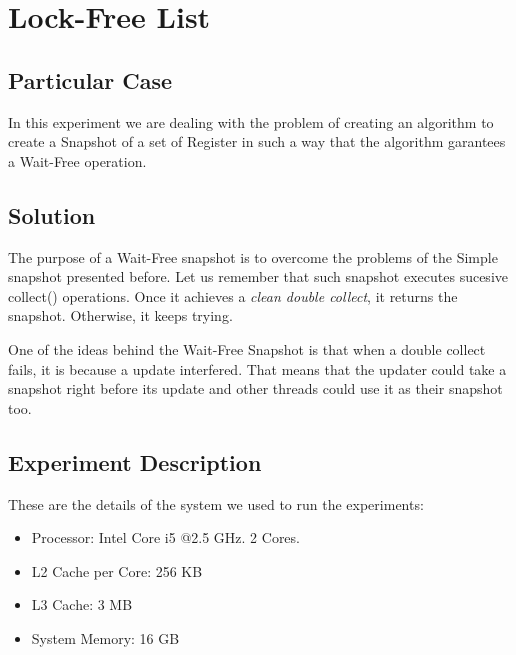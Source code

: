 \section{\textbf{Lock-Free List}}
\subsection{Particular Case}
\par
In this experiment we are dealing with the problem of creating an algorithm to
create a Snapshot of a set of Register in such a way that the algorithm
garantees a Wait-Free operation.
\par
\subsection{Solution}
\par
The purpose of a Wait-Free snapshot is to overcome the problems of the Simple snapshot presented before. Let us remember that such snapshot executes sucesive collect() operations. Once it achieves a \textit{clean double collect}, it returns the snapshot. Otherwise, it keeps trying. 
\par
One of the ideas behind the Wait-Free Snapshot is that when a double collect fails, it is because a update interfered. That means that the updater could take a snapshot right before its update and other threads could use it as their snapshot too. 
\par
\subsection{Experiment Description}
\par
These are the details of the system we used to run the experiments:
\begin{itemize}
\item Processor: Intel Core i5 @2.5 GHz. 2 Cores.
\item L2 Cache per Core: 256 KB
\item L3 Cache: 3 MB
\item System Memory: 16 GB
\end{itemize}

